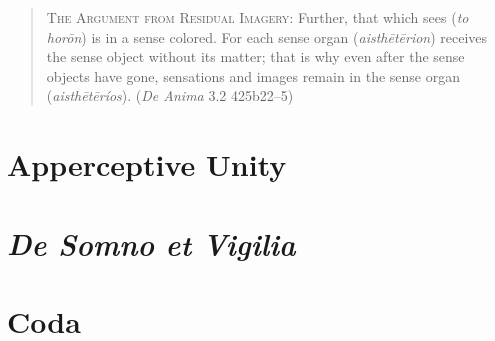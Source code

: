 \begin{quote}
	\textsc{The Argument from Residual Imagery}: Further, that which sees (\emph{to horōn}) is in a sense colored. For each sense organ (\emph{aisthētērion}) receives the sense object without its matter; that is why even after the sense objects have gone, sensations and images remain in the sense organ (\emph{aisthētēríos}). (\emph{De Anima} 3.2 425b22–5)
\end{quote}



\section{Apperceptive Unity} %
\label{sec:apperceptive_unity}


\section{\emph{De Somno et Vigilia}} %
\label{sec:_emph_de_somno_et_vigilia}


\section{Coda} %
\label{sec:coda2}


